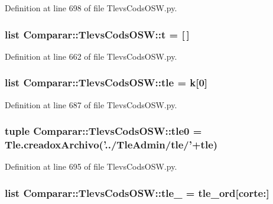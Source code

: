 \-Definition at line 698 of file \-Tlevs\-Cods\-O\-S\-W.\-py.

\subsubsection[{t}]{\setlength{\rightskip}{0pt plus 5cm}list {\bf \-Comparar\-::\-Tlevs\-Cods\-O\-S\-W\-::t} = [$\,$]}\label{namespace_comparar_1_1_tlevs_cods_o_s_w_a573d95346e8f216e0115deb293eecfa6}


\-Definition at line 662 of file \-Tlevs\-Cods\-O\-S\-W.\-py.

\subsubsection[{tle}]{\setlength{\rightskip}{0pt plus 5cm}list {\bf \-Comparar\-::\-Tlevs\-Cods\-O\-S\-W\-::tle} = k[0]}\label{namespace_comparar_1_1_tlevs_cods_o_s_w_ad5fef370da15e7e3e9fa5434f24e419d}


\-Definition at line 687 of file \-Tlevs\-Cods\-O\-S\-W.\-py.

\subsubsection[{tle0}]{\setlength{\rightskip}{0pt plus 5cm}tuple {\bf \-Comparar\-::\-Tlevs\-Cods\-O\-S\-W\-::tle0} = {\bf \-Tle.\-creadox\-Archivo}('../\-Tle\-Admin/{\bf tle}/'+{\bf tle})}\label{namespace_comparar_1_1_tlevs_cods_o_s_w_a76fc5a1006fc5c6c6a11953bbd2b9379}


\-Definition at line 695 of file \-Tlevs\-Cods\-O\-S\-W.\-py.

\subsubsection[{tle\-\_\-15}]{\setlength{\rightskip}{0pt plus 5cm}list {\bf \-Comparar\-::\-Tlevs\-Cods\-O\-S\-W\-::tle\-\_} = {\bf tle\-\_\-ord}[corte\-:]}\label{namespace_comparar_1_1_tlevs_cods_o_s_w_a7a65b12548a20c0076b5a3e2dd451e28}


